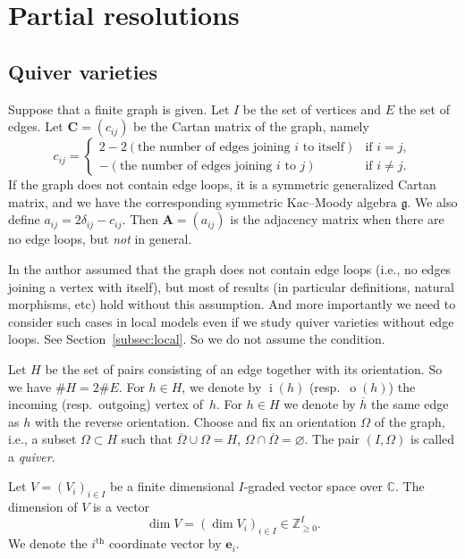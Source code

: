 \documentclass[11pt]{article}
\theoremstyle{definition}
\numberwithin{equation}{section}
\newcommand{\subsecref}[1]{Section~\ref{#1}}
\newcommand{\C}{{\mathbb C}}
\newcommand{\g}{{\mathfrak g}}
\newcommand{\vin}[1]{\operatorname{i}(#1)} %
\newcommand{\vout}[1]{\operatorname{o}(#1)} %
\newcommand{\bC}{{\mathbf C}} %
\newcommand{\bA}{{\mathbf A}} %
\newcommand{\be}{{\mathbf e}}
\begin{document}
\section{Partial resolutions}\label{sec:partial}

\subsection{Quiver varieties}\label{subsec:quiver}

Suppose that a f\/inite graph is given. Let $I$ be the set of vertices
and $E$ the set of edges.
%
Let $\bC = (c_{ij})$ be the Cartan matrix of the graph, namely
\begin{equation*}
   c_{ij} =
   \begin{cases}
     2 - 2 (\text{the number of edges joining $i$ to itself})
     & \text{if $i=j$},
\\
     - (\text{the number of edges joining $i$ to $j$})
     & \text{if $i\neq j$}.
   \end{cases}
\end{equation*}
If the graph does not contain edge loops, it is a symmetric
generalized Cartan matrix, and we have the corresponding symmetric
Kac--Moody algebra $\g$. We also def\/ine
\(
   a_{ij} = 2\delta_{ij} - c_{ij}.
\)
Then $\bA = (a_{ij})$ is the adjacency matrix when there are no edge
loops, but {\it not} in general.

In \cite{Na-quiver,Na-alg} the author assumed that the graph does not
contain edge loops (i.e., no edges joining a vertex with itself), but
most of results (in particular def\/initions, natural morphisms, etc)
hold without this assumption. And more importantly we need to consider
such cases in local models even if we study quiver varieties without
edge loops. See \subsecref{subsec:local}. So we do not assume the
condition.

Let $H$ be the set of pairs consisting of an edge together with its
orientation. So we have $\# H = 2\# E$.
%
For $h\in H$, we denote by $\vin{h}$ (resp.\ $\vout{h}$) the incoming
(resp.\ outgoing) vertex of~$h$.  For $h\in H$ we denote by $\overline
h$ the same edge as $h$ with the reverse orientation.
%
Choose and f\/ix an orientation $\Omega$ of the graph,
i.e., a subset $\Omega\subset H$ such that
$\overline\Omega\cup\Omega = H$, $\Omega\cap\overline\Omega = \varnothing$.
%
The pair $(I,\Omega)$ is called a {\it quiver}.


Let $V = (V_i)_{i\in I}$ be a f\/inite dimensional $I$-graded vector
space over $\C$. The dimension of $V$ is a vector
\[
  \dim V = (\dim V_i)_{i\in I}\in \mathbb Z_{\ge 0}^I.
\]
We denote the $i^{\mathrm{th}}$ coordinate vector by $\be_i$.
\end{document}
